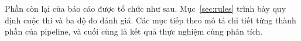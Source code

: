 \documentclass[conference]{IEEEtran}
\begin{document}
\noindent Phần còn lại của báo cáo được tổ chức như sau.
Mục~\ref{sec:rules} trình bày quy định cuộc thi và ba độ đo đánh giá. Các mục
tiếp theo mô tả chi tiết từng thành phần của pipeline, và cuối cùng là kết quả
thực nghiệm cùng phân tích.





\end{document}
